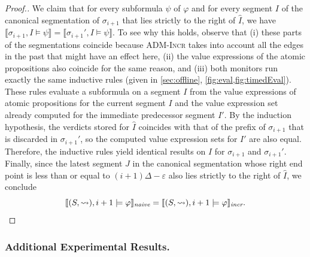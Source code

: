 \begin{proof}[\normalsize Proof.]
	We claim that for every subformula $\psi$ of $\varphi$ and for every segment $I$ of the canonical segmentation of $\sigma_{i+1}$ that lies strictly to the right of $\hat{I}$, we have $\llbracket \sigma_{i+1}, I \models \psi\rrbracket = \llbracket \sigma_{i+1}', I \models \psi \rrbracket$.
	To see why this holds, observe that (i) these parts of the segmentations coincide because \textsc{ADM-Incr} takes into account all the edges in the past that might have an effect here, (ii) the value expressions of the atomic propositions also coincide for the same reason, and (iii) both monitors run exactly the same inductive rules (given in \cref{sec:offline}, \cref{fig:eval,fig:timedEval}).
	These rules evaluate a subformula on a segment $I$ from the value expressions of atomic propositions for the current segment $I$ and the value expression set already computed for the immediate predecessor segment $I'$.
	By the induction hypothesis, the verdicts stored for $\hat{I}$ coincides with that of the prefix of $\sigma_{i+1}$ that is discarded in $\sigma_{i+1}'$, so the computed value expression sets for $I'$ are also equal.
	Therefore, the inductive rules yield identical results on $I$ for $\sigma_{i+1}$ and $\sigma_{i+1}'$.
	Finally, since the latest segment $J$ in the canonical segmentation whose right end point is less than or equal to $(i+1)\Delta - \varepsilon$ also lies strictly to the right of $\hat{I}$, we conclude
	$$\llbracket (S,\rightsquigarrow), i+1 \models \varphi \rrbracket_{\textit{naive}} = \llbracket (S,\rightsquigarrow), i+1 \models \varphi \rrbracket_{\textit{incr}}.$$
\end{proof}
\egroup


\subsubsection*{Additional Experimental Results.}


